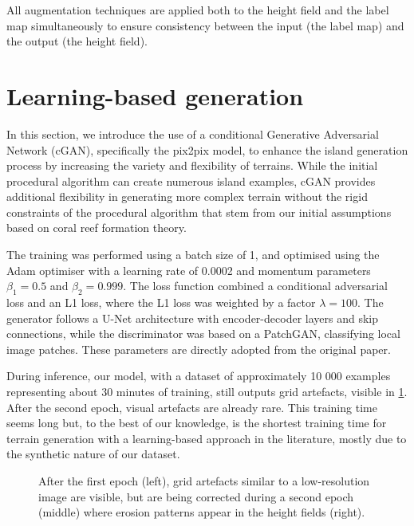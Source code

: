 All augmentation techniques are applied both to the height field and the label map simultaneously to ensure consistency between the input (the label map) and the output (the height field).

\section{Learning-based generation}
\label{sec:coral-island-cGAN-training}

In this section, we introduce the use of a conditional Generative Adversarial Network (cGAN), specifically the pix2pix model, to enhance the island generation process by increasing the variety and flexibility of terrains. While the initial procedural algorithm can create numerous island examples, cGAN provides additional flexibility in generating more complex terrain without the rigid constraints of the procedural algorithm that stem from our initial assumptions based on coral reef formation theory.

The training was performed using a batch size of 1, and optimised using the Adam optimiser with a learning rate of 0.0002 and momentum parameters $\beta_1 = 0.5$ and $\beta_2 = 0.999$. The loss function combined a conditional adversarial loss and an L1 loss, where the L1 loss was weighted by a factor $\lambda = 100$. The generator follows a U-Net architecture with encoder-decoder layers and skip connections, while the discriminator was based on a PatchGAN, classifying local image patches. These parameters are directly adopted from the original paper.

During inference, our model, with a dataset of approximately 10 000 examples representing about 30 minutes of training, still outputs grid artefacts, visible in \cref{fig:coral-island-first-epoch}. After the second epoch, visual artefacts are already rare. This training time seems long but, to the best of our knowledge, is the shortest training time for terrain generation with a learning-based approach in the literature, mostly due to the synthetic nature of our dataset.

\begin{figure}[t]
\caption{After the first epoch (left), grid artefacts similar to a low-resolution image are visible, but are being corrected during a second epoch (middle) where erosion patterns appear in the height fields (right).}
\label{fig:coral-island-first-epoch}
\end{figure}


